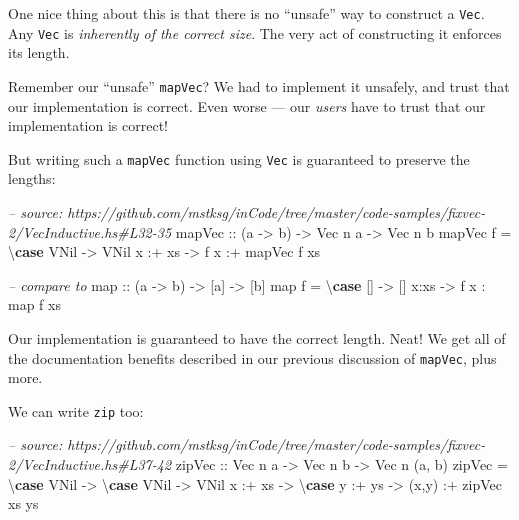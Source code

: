 \documentclass[]{article}
\newenvironment{Shaded}{}{}
\newcommand{\KeywordTok}[1]{\textcolor[rgb]{0.00,0.44,0.13}{\textbf{#1}}}
\newcommand{\DataTypeTok}[1]{\textcolor[rgb]{0.56,0.13,0.00}{#1}}
\newcommand{\CommentTok}[1]{\textcolor[rgb]{0.38,0.63,0.69}{\textit{#1}}}
\newcommand{\OtherTok}[1]{\textcolor[rgb]{0.00,0.44,0.13}{#1}}
\newcommand{\FunctionTok}[1]{\textcolor[rgb]{0.02,0.16,0.49}{#1}}
\newcommand{\NormalTok}[1]{#1}
\begin{document}
One nice thing about this is that there is no ``unsafe'' way to construct a
\texttt{Vec}. Any \texttt{Vec} is \emph{inherently of the correct size}. The
very act of constructing it enforces its length.

Remember our ``unsafe'' \texttt{mapVec}? We had to implement it unsafely, and
trust that our implementation is correct. Even worse --- our \emph{users} have
to trust that our implementation is correct!

But writing such a \texttt{mapVec} function using \texttt{Vec} is guaranteed to
preserve the lengths:

\begin{Shaded}
\begin{Highlighting}[]
\CommentTok{-- source: https://github.com/mstksg/inCode/tree/master/code-samples/fixvec-2/VecInductive.hs#L32-35}
\OtherTok{mapVec ::}\NormalTok{ (a }\OtherTok{->}\NormalTok{ b) }\OtherTok{->} \DataTypeTok{Vec}\NormalTok{ n a }\OtherTok{->} \DataTypeTok{Vec}\NormalTok{ n b}
\NormalTok{mapVec f }\FunctionTok{=}\NormalTok{ \textbackslash{}}\KeywordTok{case}
    \DataTypeTok{VNil}    \OtherTok{->} \DataTypeTok{VNil}
\NormalTok{    x }\FunctionTok{:+}\NormalTok{ xs }\OtherTok{->}\NormalTok{ f x }\FunctionTok{:+}\NormalTok{ mapVec f xs}



\CommentTok{-- compare to}
\NormalTok{map}\OtherTok{ ::}\NormalTok{ (a }\OtherTok{->}\NormalTok{ b) }\OtherTok{->}\NormalTok{ [a] }\OtherTok{->}\NormalTok{ [b]}
\NormalTok{map f }\FunctionTok{=}\NormalTok{ \textbackslash{}}\KeywordTok{case}
\NormalTok{    [] }\OtherTok{->}\NormalTok{ []}
\NormalTok{    x}\FunctionTok{:}\NormalTok{xs }\OtherTok{->}\NormalTok{ f x }\FunctionTok{:}\NormalTok{ map f xs}
\end{Highlighting}
\end{Shaded}

Our implementation is guaranteed to have the correct length. Neat! We get all of
the documentation benefits described in our previous discussion of
\texttt{mapVec}, plus more.

We can write \texttt{zip} too:

\begin{Shaded}
\begin{Highlighting}[]
\CommentTok{-- source: https://github.com/mstksg/inCode/tree/master/code-samples/fixvec-2/VecInductive.hs#L37-42}
\OtherTok{zipVec ::} \DataTypeTok{Vec}\NormalTok{ n a }\OtherTok{->} \DataTypeTok{Vec}\NormalTok{ n b }\OtherTok{->} \DataTypeTok{Vec}\NormalTok{ n (a, b)}
\NormalTok{zipVec }\FunctionTok{=}\NormalTok{ \textbackslash{}}\KeywordTok{case}
    \DataTypeTok{VNil} \OtherTok{->}\NormalTok{ \textbackslash{}}\KeywordTok{case}
      \DataTypeTok{VNil} \OtherTok{->} \DataTypeTok{VNil}
\NormalTok{    x }\FunctionTok{:+}\NormalTok{ xs }\OtherTok{->}\NormalTok{ \textbackslash{}}\KeywordTok{case}
\NormalTok{      y }\FunctionTok{:+}\NormalTok{ ys }\OtherTok{->}\NormalTok{ (x,y) }\FunctionTok{:+}\NormalTok{ zipVec xs ys}
\end{Highlighting}
\end{Shaded}
\end{document}

